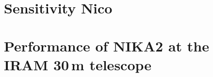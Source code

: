 \documentclass[a4paper, 11pt]{report}
\begin{document}



\clearpage
%


\clearpage
\chapter{Sensitivity {\color{YellowGreen} Nico}}
\label{se:nefd}
%

%
%



\clearpage
\chapter{Performance of NIKA2 at the IRAM 30\,m telescope}
\label{se:summary}



\clearpage
\appendix
\end{document}

